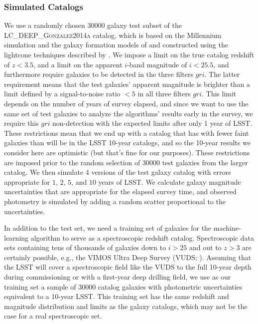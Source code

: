 \documentclass[DM,lsstdraft,toc]{lsstdoc}
\begin{document}
\subsubsection{Simulated Catalogs}\label{sssec:sel_ex_cats}

We use a randomly chosen 30000 galaxy test subset of the \textsc{LC\_DEEP\_Gonzalez2014a} catalog, which is based on the Millennium simulation \citep{2005Natur.435..629S} and the galaxy formation models of \cite{2014MNRAS.439..264G} and constructed using the lightcone techniques described by \cite{2013MNRAS.429..556M}. We impose a limit on the true catalog redshift of $z<3.5$, and a limit on the apparent $i$-band magnitude of $i<25.5$, and furthermore require galaxies to be detected in the three filters $gri$. The latter requirement means that the test galaxies' apparent magnitude is brighter than a limit defined by a signal-to-noise ratio $<5$ in all three filters $gri$. This limit depends on the number of years of survey elapsed, and since we want to use the same set of test galaxies to analyze the algorithms' results early in the survey, we require this $gri$ non-detection with the expected limits after only 1 year of LSST. These restrictions mean that we end up with a catalog that has with fewer faint galaxies than will be in the LSST 10-year catalogs, and so the 10-year results we consider here are optimistic (but that's fine for our purposes). These restrictions are imposed prior to the random selection of 30000 test galaxies from the larger catalog. We then simulate 4 versions of the test galaxy catalog with errors appropriate for $1$, $2$, $5$, and $10$ years of LSST. We calculate galaxy magnitude uncertainties that are appropriate for the elapsed survey time, and observed photometry is simulated by adding a random scatter proportional to the uncertainties.

In addition to the test set, we need a training set of galaxies for the machine-learning algorithm to serve as a spectroscopic redshift catalog. Spectroscopic data sets containing tens of thousands of galaxies down to $i>25$ and out to $z>3$ are certainly possible, e.g., the VIMOS Ultra Deep Survey (VUDS; \citealt{2015A&A...576A..79L}). Assuming that the LSST will cover a spectroscopic field like the VUDS to the full 10-year depth during commissioning or with a first-year deep drilling field, we use as our training set a sample of 30000 catalog galaxies with photometric uncertainties equivalent to a 10-year LSST. This training set has the same redshift and magnitude distribution and limits as the galaxy catalogs, which may not be the case for a real spectroscopic set.
\end{document}
